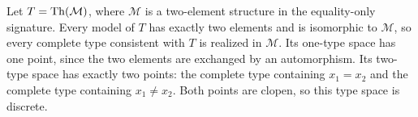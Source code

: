 \begin{example}
Let \(T=\operatorname{Th}(\mathcal M)\), where \(\mathcal M\) is a two-element structure in
the equality-only signature.  Every model of \(T\) has exactly two
elements and is isomorphic to \(\mathcal M\), so every complete type
consistent with \(T\) is realized in \(\mathcal M\).  Its one-type space
has one point, since the two
elements are exchanged by an automorphism.  Its two-type space has exactly two
points: the complete type containing \(x_1=x_2\) and the complete type
containing \(x_1\ne x_2\).  Both points are clopen, so this type space is
discrete.
\end{example}

